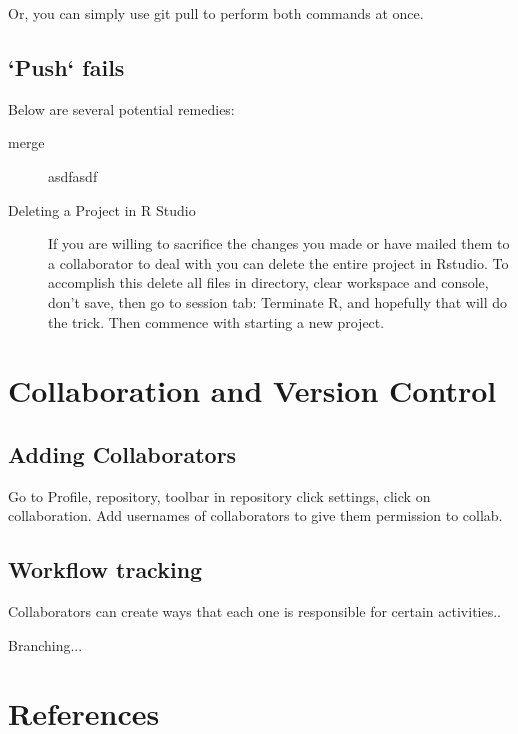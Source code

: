 \documentclass[12pt]{../SOP4_alpha}\usepackage[]{graphicx}\usepackage[]{color}
\begin{document}
\NP Or, you can simply use git pull to perform both commands at once.



\subsection{`Push` fails}

\NP Below are several potential remedies:

\begin{description}
  \item[merge] asdfasdf
  
  \item[Deleting a Project in R Studio]If you are willing to sacrifice the changes you made or have mailed them to a collaborator to deal with you can delete the entire project in Rstudio. To accomplish this delete all files in directory, clear workspace and console, don't save, then go to session tab: Terminate R, and hopefully that will do the trick. Then commence with starting a new project. 

\end{description}



\section{Collaboration and Version Control}

\subsection{Adding Collaborators}
\NP Go to Profile, repository, toolbar in repository click settings, click on collaboration. Add usernames of collaborators to give them permission to collab.

\subsection{Workflow tracking}

\NP Collaborators can create ways that each one is responsible for certain activities..

\NP Branching...
 

\section{References}

\NP 
\end{document}
